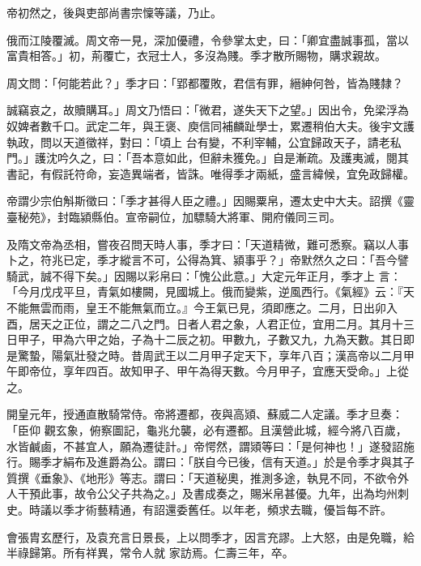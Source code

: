 \begin{pinyinscope}
 帝初然之，後與吏部尚書宗懍等議，乃止。



 俄而江陵覆滅。周文帝一見，深加優禮，令參掌太史，曰：「卿宜盡誠事孤，當以富貴相答。」初，荊覆亡，衣冠士人，多沒為賤。季才散所賜物，購求親故。



 周文問：「何能若此？」季才曰：「郢都覆敗，君信有罪，縉紳何咎，皆為賤隸？



 誠竊哀之，故贖購耳。」周文乃悟曰：「微君，遂失天下之望。」因出令，免梁浮為奴婢者數千口。武定二年，與王褒、庾信同補麟趾學士，累遷稍伯大夫。後宇文護執政，問以天道徵祥，對曰：「頃上
 台有變，不利宰輔，公宜歸政天子，請老私門。」護沈吟久之，曰：「吾本意如此，但辭未獲免。」自是漸疏。及護夷滅，閱其書記，有假託符命，妄造異端者，皆誅。唯得季才兩紙，盛言緯候，宜免政歸權。



 帝謂少宗伯斛斯徵曰：「季才甚得人臣之禮。」因賜粟帛，遷太史中大夫。詔撰《靈臺秘苑》，封臨潁縣伯。宣帝嗣位，加驃騎大將軍、開府儀同三司。



 及隋文帝為丞相，嘗夜召問天時人事，季才曰：「天道精微，難可悉察。竊以人事卜之，符兆已定，季才縱言不可，公得為箕、潁事乎？」帝默然久之曰：「吾今譬騎武，誠不得下矣。」因賜以彩帛曰：「愧公此意。」大定元年正月，季才上
 言：「今月戊戌平旦，青氣如樓闕，見國城上。俄而變紫，逆風西行。《氣經》云：『天不能無雲而雨，皇王不能無氣而立。』今王氣已見，須即應之。二月，日出卯入酉，居天之正位，謂之二八之門。日者人君之象，人君正位，宜用二月。其月十三日甲子，甲為六甲之始，子為十二辰之初。甲數九，子數又九，九為天數。其日即是驚蟄，陽氣壯發之時。昔周武王以二月甲子定天下，享年八百；漢高帝以二月甲午即帝位，享年四百。故知甲子、甲午為得天數。今月甲子，宜應天受命。」上從之。



 開皇元年，授通直散騎常侍。帝將遷都，夜與高熲、蘇威二人定議。季才旦奏：「臣仰
 觀玄象，俯察圖記，龜兆允襲，必有遷都。且漢營此城，經今將八百歲，水皆鹹鹵，不甚宜人，願為遷徒計。」帝愕然，謂熲等曰：「是何神也！」遂發詔施行。賜季才絹布及進爵為公。謂曰：「朕自今已後，信有天道。」於是令季才與其子質撰《垂象》、《地形》等志。謂曰：「天道秘奧，推測多途，執見不同，不欲令外人干預此事，故令公父子共為之。」及書成奏之，賜米帛甚優。九年，出為均州刺史。時議以季才術藝精通，有詔還委舊任。以年老，頻求去職，優旨每不許。



 會張胄玄歷行，及袁充言日景長，上以問季才，因言充謬。上大怒，由是免職，給半祿歸第。所有祥異，常令人就
 家訪焉。仁壽三年，卒。



\end{pinyinscope}
